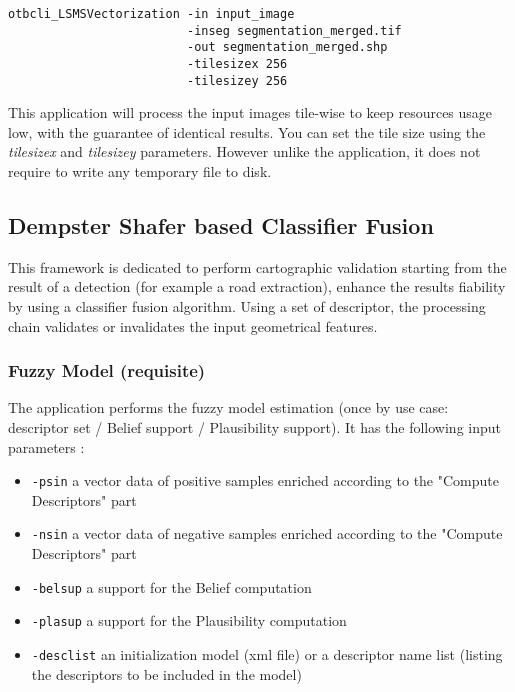 \begin{verbatim}
otbcli_LSMSVectorization -in input_image 
                         -inseg segmentation_merged.tif 
                         -out segmentation_merged.shp 
                         -tilesizex 256 
                         -tilesizey 256
\end{verbatim}

This application will process the input images tile-wise
to keep resources usage low, with the guarantee of identical
results. You can set the tile size using the \emph{tilesizex} and
\emph{tilesizey} parameters. However unlike the
 application, it does not require to
write any temporary file to disk.

\subsection{Dempster Shafer based Classifier Fusion}\label{ssec:classifierfusion}

This framework is dedicated to perform cartographic validation starting
from the result of a detection (for example a road extraction), enhance
the results fiability by using a classifier fusion algorithm. Using a
set of descriptor, the processing chain validates or invalidates the
input geometrical features.

%

\subsubsection{Fuzzy Model (requisite)}

The  application performs the fuzzy
model estimation (once by use case: descriptor set / Belief support /
Plausibility support). It has the following input parameters :
\begin{itemize}
\item \verb?-psin? a vector data of positive samples enriched according to the
"Compute Descriptors" part
\item \verb?-nsin? a vector data of negative samples enriched according to the
"Compute Descriptors" part
\item \verb?-belsup? a support for the Belief computation
\item \verb?-plasup? a support for the Plausibility computation
\item \verb?-desclist? an initialization model (xml file) or a descriptor name list
(listing the descriptors to be included in the model)
\end{itemize}

